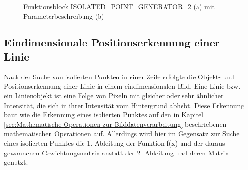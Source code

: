 \documentclass[ngerman,12pt]{article} %
\begin{document}
{\begin{figure}[h!tb]
  \centering
  \qquad
  \caption[Funktionsblock ISOLATED\_POINT\_GENERATOR\_2 mit Parameterbeschreibung des ]{\label{pic:ISOLATED_POINT_GENERATOR_2}Funktionsblock  ISOLATED\_POINT\_GENERATOR\_2 (a) mit Parameterbeschreibung (b)}
\end{figure}



\subsection{Eindimensionale Positionserkennung einer Linie}
\label{sec:Eindimensionale Positionserkennung einer Linie}
Nach der Suche von isolierten Punkten in einer Zeile erfolgte die Objekt- und Positionserkennung einer Linie in einem eindimensionalen Bild. Eine Linie bzw. ein Linienobjekt ist eine Folge von Pixeln mit gleicher oder sehr ähnlicher Intensität, die sich in ihrer Intensität vom Hintergrund abhebt. Diese Erkennung baut wie die Erkennung eines isolierten Punktes auf den in Kapitel \ref{sec:Mathematische Operationen zur Bilddatenverarbeitung} beschriebenen mathematischen Operationen auf. Allerdings wird hier im Gegensatz zur Suche eines isolierten Punktes die 1. Ableitung der Funktion f(x) und der daraus gewonnenen Gewichtungsmatrix anstatt der 2. Ableitung und deren Matrix genutzt.\newline

}
\end{document}
